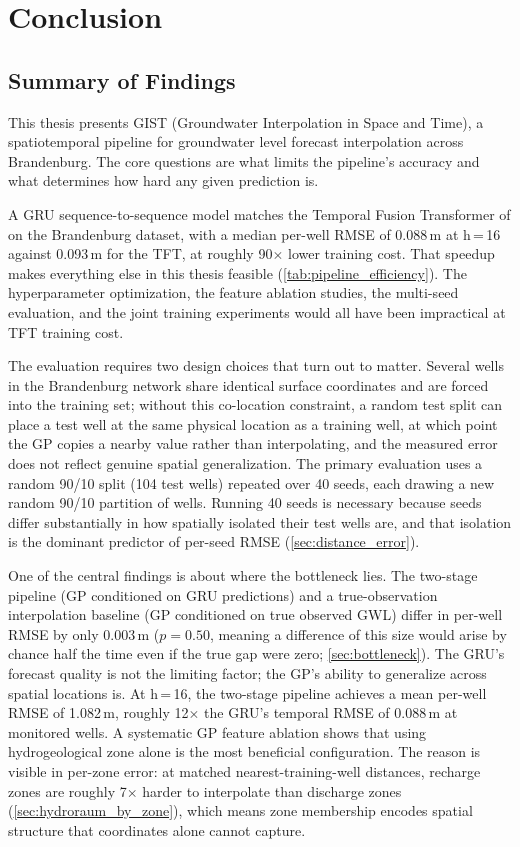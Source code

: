 \chapter{Conclusion}
\label{ch:conclusion}

\section{Summary of Findings}
\label{sec:summary}

This thesis presents GIST (Groundwater Interpolation in Space and Time), a spatiotemporal pipeline for groundwater level forecast interpolation across Brandenburg. The core questions are what limits the pipeline's accuracy and what determines how hard any given prediction is.

A GRU sequence-to-sequence model matches the Temporal Fusion Transformer of \citet{kunz2025} on the Brandenburg dataset, with a median per-well RMSE of 0.088\,m at h\,=\,16 against 0.093\,m for the TFT, at roughly 90$\times$ lower training cost. That speedup makes everything else in this thesis feasible (\cref{tab:pipeline_efficiency}). The hyperparameter optimization, the feature ablation studies, the multi-seed evaluation, and the joint training experiments would all have been impractical at TFT training cost.

The evaluation requires two design choices that turn out to matter. Several wells in the Brandenburg network share identical surface coordinates and are forced into the training set; without this co-location constraint, a random test split can place a test well at the same physical location as a training well, at which point the GP copies a nearby value rather than interpolating, and the measured error does not reflect genuine spatial generalization. The primary evaluation uses a random 90/10 split (104 test wells) repeated over 40 seeds, each drawing a new random 90/10 partition of wells. Running 40 seeds is necessary because seeds differ substantially in how spatially isolated their test wells are, and that isolation is the dominant predictor of per-seed RMSE (\cref{sec:distance_error}).

One of the central findings is about where the bottleneck lies. The two-stage pipeline (GP conditioned on GRU predictions) and a true-observation interpolation baseline (GP conditioned on true observed GWL) differ in per-well RMSE by only 0.003\,m ($p = 0.50$, meaning a difference of this size would arise by chance half the time even if the true gap were zero; \cref{sec:bottleneck}). The GRU's forecast quality is not the limiting factor; the GP's ability to generalize across spatial locations is. At h\,=\,16, the two-stage pipeline achieves a mean per-well RMSE of 1.082\,m, roughly 12$\times$ the GRU's temporal RMSE of 0.088\,m at monitored wells. A systematic GP feature ablation shows that using hydrogeological zone alone is the most beneficial configuration. The reason is visible in per-zone error: at matched nearest-training-well distances, recharge zones are roughly 7$\times$ harder to interpolate than discharge zones (\cref{sec:hydroraum_by_zone}), which means zone membership encodes spatial structure that coordinates alone cannot capture.

